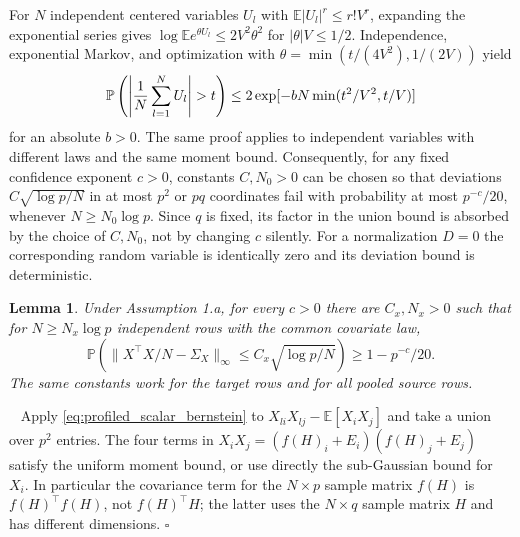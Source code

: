 \documentclass[12pt]{article}
\newtheorem{lemma}{Lemma}
\newenvironment{pf}{{\noindent \it Proof}\ }{\hfill $\square$\par}
\begin{document}
For $N$ independent centered variables $U_l$ with
$\mathbb E|U_l|^r\le r!V^r$, expanding the exponential series gives
$\log\mathbb E e^{\theta U_l}\le2V^2\theta^2$ for
$|\theta|V\le1/2$. Independence, exponential Markov, and optimization
with $\theta=\min(t/(4V^2),1/(2V))$ yield
\begin{equation}
 \mathbb P\left(\left|{1\over N}\sum_{l=1}^NU_l\right|>t\right)
 \le2\exp[-bN\min(t^2/V^2,t/V)]
 \label{eq:profiled_scalar_bernstein}
\end{equation}
for an absolute $b>0$. The same proof applies to independent variables
with different laws and the same moment bound. Consequently, for any
fixed confidence exponent $c>0$, constants $C,N_0>0$ can be chosen so
that deviations $C\sqrt{\log p/N}$ in at most $p^2$ or $pq$ coordinates
fail with probability at most $p^{-c}/20$, whenever
$N\ge N_0\log p$. Since $q$ is fixed, its factor in the union bound is
absorbed by the choice of $C,N_0$, not by changing $c$ silently.
For a normalization $D=0$ the corresponding random variable is identically
zero and its deviation bound is deterministic.

\begin{lemma}
\label{lem:error_sample_covariance1}
Under Assumption 1.a, for every $c>0$ there are $C_x,N_x>0$ such that for
$N\ge N_x\log p$ independent rows with the common covariate law,
\[
 \mathbb P\left(\|X^\top X/N-\Sigma_X\|_\infty
                 \le C_x\sqrt{\log p/N}\right)\ge1-p^{-c}/20.
\]
The same constants work for the target rows and for all pooled source rows.
\end{lemma}
\begin{pf}
Apply \eqref{eq:profiled_scalar_bernstein} to
$X_{li}X_{lj}-\mathbb E[X_iX_j]$ and take a union over $p^2$ entries.
The four terms in $X_iX_j=(f(H)_i+E_i)(f(H)_j+E_j)$ satisfy the uniform
moment bound, or use directly the sub-Gaussian bound for $X_i$.
In particular the covariance term for the $N\times p$ sample matrix
$f(H)$ is $f(H)^\top f(H)$, not $f(H)^\top H$; the latter
uses the $N\times q$ sample matrix $H$ and has different dimensions.
\end{pf}
\end{document}
